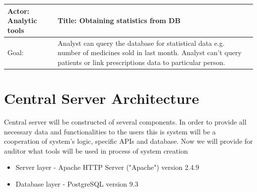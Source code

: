    \begin{longtable}{| p{6cm} | p{7.75cm} |}
    \hline
    Actor: Analytic tools &Title: Obtaining statistics from DB \\ \hline
    Goal: & Analyst can query the database for statistical data e.g. number of medicines sold in last month. Analyst can't query patients or link prescriptions data to particular person. \\ \hline
    \end{longtable}


\section{Central Server Architecture}

Central server will be constructed of several components. In order to provide all necessary data and functionalities to the users this is system will be a cooperation of system's logic, specific APIs and database. Now we will provide for auditor what tools will be used in process of system creation
\begin{itemize}
\item Server layer - Apache HTTP Server ("Apache") version 2.4.9
\item Database layer - PostgreSQL version 9.3
\end{itemize}

